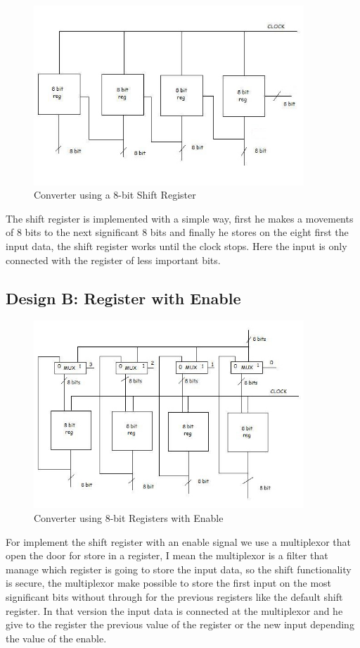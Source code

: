 \documentclass[11pt,a4paper]{article}
\begin{document}
\begin{figure}[htp]
\centering
\includegraphics[width = 4in]{./images/shiftregister.jpg}
\caption{Converter using a 8-bit Shift Register}
\end{figure}

The shift register is implemented with a simple way, first he makes a movements of 8 bits to the next significant 8 bits and finally he stores on the eight first the input data, the shift register works until the clock stops. Here the input is only connected with the register of less important bits.

\newpage
\subsection{Design B: Register with Enable}

\begin{figure}[htp]
\centering
\includegraphics[width = 4in]{./images/shiftregisterenable.jpg}
\caption{Converter using 8-bit Registers with Enable}
\end{figure}

For implement the shift register with an enable signal we use a multiplexor that open the door for store in a register, I mean the multiplexor is a filter that manage which register is going to store the input data, so the shift functionality is secure, the multiplexor make possible to store the first input on the most significant bits without through for the previous registers like the default shift register. In that version the input data is connected at the multiplexor and he give to the register the previous value of the register or the new input depending the value of the enable.
\end{document}

